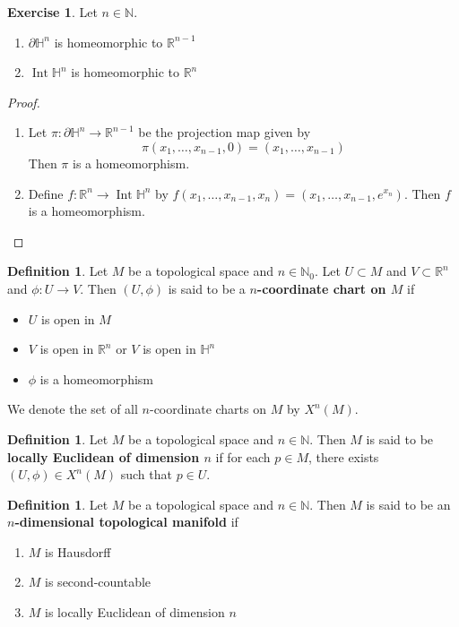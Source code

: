 \documentclass{book}
\theoremstyle{definition}
\newtheorem{defn}[definition]{Definition}
\newtheorem{ex}[definition]{Exercise}
\renewcommand{\H}{\mathbb{H}}
\newcommand{\N}{\mathbb{N}}
\newcommand{\R}{\mathbb{R}}
\DeclareMathOperator{\Int}{Int}
\DeclareMathOperator*{\0}{\mbf{0}}
\DeclareMathOperator*{\1}{\mbf{1}}
\newcommand{\tbf}[1]{\textbf{#1}}
\newcommand{\p}{\partial}
\begin{document}
	\begin{ex} Let $n \in \N$.
	\begin{enumerate}
		\item $\p \H^n$ is homeomorphic to $\R^{n-1}$
		\item $\Int \H^n$ is homeomorphic to $\R^n$
	\end{enumerate}  
	\end{ex}
	
	\begin{proof}\
	\begin{enumerate}
		\item Let $\pi: \p \H^n \rightarrow \R^{n-1}$ be the projection map given by 
		$$\pi(x_1, \ldots, x_{n-1}, 0) = (x_1, \ldots, x_{n-1})$$ 
		Then $\pi$ is a homeomorphism.
		\item Define $f: \R^n \rightarrow \Int \H^n$ by $f(x_1, \ldots, x_{n-1}, x_n) = (x_1, \ldots, x_{n-1}, e^{x_n})$. Then $f$ is a homeomorphism.
	\end{enumerate}
	\end{proof}		
	
	\begin{defn}
		Let $M$ be a topological space and $n \in \N_0$. Let $U \subset M$ and $V \subset \R^n$ and $\phi:U \rightarrow V$. Then $(U, \phi)$ is said to be a \tbf{$n$-coordinate chart on $M$} if 
		\begin{itemize}
			\item $U$ is open in $M$
			\item $V$ is open in $\R^n$ or $V$ is open in $\H^n$
			\item $\phi$ is a homeomorphism 
		\end{itemize}
	We denote the set of all $n$-coordinate charts on $M$ by $X^n(M)$.
	\end{defn}

	\begin{defn}
		Let $M$ be a topological space and $n \in \N$. Then $M$ is said to be \tbf{locally Euclidean of dimension $n$} if for each $p \in M$, there exists $(U, \phi) \in X^n(M)$ such that $p \in U$. 
	\end{defn}

	\begin{defn}
		Let $M$ be a topological space and $n \in \N$. Then $M$ is said to be an \tbf{$n$-dimensional topological manifold} if 
		\begin{enumerate}
			\item $M$ is Hausdorff
			\item $M$ is second-countable
			\item $M$ is locally Euclidean of dimension $n$
		\end{enumerate}
	\end{defn}
\end{document}
